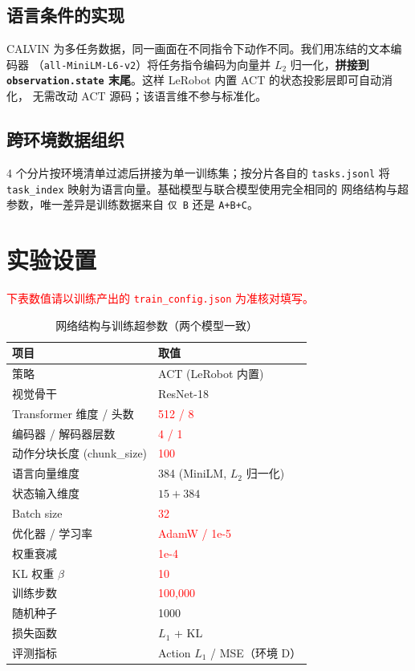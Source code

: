 \documentclass[11pt]{ctexart}
\begin{document}
\subsection{语言条件的实现}
CALVIN 为多任务数据，同一画面在不同指令下动作不同。我们用冻结的文本编码器
（\texttt{all-MiniLM-L6-v2}）将任务指令编码为向量并 $L_2$ 归一化，\textbf{拼接到
\texttt{observation.state} 末尾}。这样 LeRobot 内置 ACT 的状态投影层即可自动消化，
无需改动 ACT 源码；该语言维不参与标准化。

\subsection{跨环境数据组织}
4 个分片按环境清单过滤后拼接为单一训练集；按分片各自的 \texttt{tasks.jsonl}
将 \texttt{task\_index} 映射为语言向量。基础模型与联合模型使用完全相同的
网络结构与超参数，唯一差异是训练数据来自 \texttt{仅 B} 还是 \texttt{A+B+C}。

\section{实验设置}
\textcolor{red}{下表数值请以训练产出的 \texttt{train\_config.json} 为准核对填写。}
\begin{table}[h]\centering
\caption{网络结构与训练超参数（两个模型一致）}\label{tab:hparam}
\begin{tabular}{ll}
\toprule
项目 & 取值 \\
\midrule
策略 & ACT (LeRobot 内置) \\
视觉骨干 & ResNet-18 \\
Transformer 维度 / 头数 & \textcolor{red}{512 / 8} \\
编码器 / 解码器层数 & \textcolor{red}{4 / 1} \\
动作分块长度 (chunk\_size) & \textcolor{red}{100} \\
语言向量维度 & 384 (MiniLM, $L_2$ 归一化) \\
状态输入维度 & $15 + 384$ \\
Batch size & \textcolor{red}{32} \\
优化器 / 学习率 & \textcolor{red}{AdamW / 1e-5} \\
权重衰减 & \textcolor{red}{1e-4} \\
KL 权重 $\beta$ & \textcolor{red}{10} \\
训练步数 & \textcolor{red}{100{,}000} \\
随机种子 & 1000 \\
损失函数 & $L_1$ + KL \\
评测指标 & Action $L_1$ / MSE（环境 D） \\
\bottomrule
\end{tabular}
\end{table}
\end{document}
